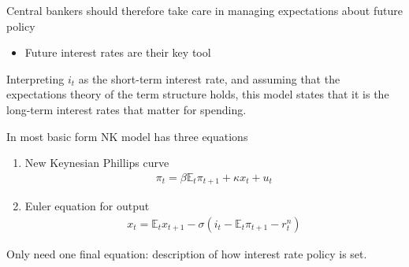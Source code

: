 \documentclass{beamer}
\begin{document}
\begin{frame}
  Central bankers should therefore take care in managing expectations about future policy
  \begin{itemize}
    \item Future interest rates are their key tool
  \end{itemize}
Interpreting $i_t$ as the short-term interest rate, and assuming that the expectations theory of the term structure holds, this model states that it is the long-term interest rates that matter for spending.   
\end{frame}


\begin{frame}
  In most basic form NK model has three equations
\begin{enumerate}
  \item New Keynesian Phillips curve
  \begin{align} \pi_t=\beta \mathbb{E}_t \pi_{t+1} + \kappa x_t + u_t \end{align}
  \item Euler equation for output
  \begin{align} x_t = \mathbb{E}_t x_{t+1} - \sigma (i_t - \mathbb{E}_t \pi_{t+1} - r_t^n) \end{align}
\end{enumerate}
 \medskip
 Only need one final equation: description of how interest rate policy is set.
\end{frame}
\end{document}

